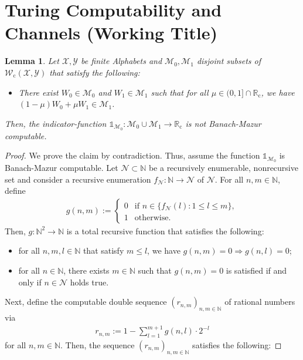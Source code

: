 \documentclass[conference]{IEEEtran}
\def\X{{\mathcal X}}
\def\Y{{\mathcal Y}}
\def\M{{\mathcal M}}
\def\N{{\mathcal N}}
\def\W{{\mathcal W}}
\def\NN{{\mathbb N}}
\def\RR{{\mathbb R}}
\newcommand{\RRc}{\RR_{\mathrm{c}}}
\newcommand{\Wc}{\W_{\mathrm{c}}}
\newtheorem{Lemma}[Theorem]{Lemma}
\begin{document}
\section{Turing Computability and Channels (Working Title)}
	\begin{Lemma}	Let \(\X,\Y\) be finite Alphabets and \(\M_0, \M_1\) disjoint subsets of \(\Wc(\X,\Y)\) that satisfy the following:
					\begin{itemize}	\item There exist \(W_0\in\M_0\) and \(W_1\in\M_1\) such that for all \(\mu \in (0,1]\cap \RRc\), 													
										we have \((1-\mu)W_0 + \mu W_1 \in \M_1\). 
					\end{itemize}
					Then, the indicator-function \(\mathds{1}_{\M_0} : \M_0\cup \M_1 \rightarrow \RRc\) is \emph{not} Banach-Mazur computable.
	\end{Lemma}\begin{proof}
					We prove the claim by contradiction. Thus, assume the function \(\mathds{1}_{\M_0}\) is Banach-Mazur computable. Let 
					\(\N\subset \NN\) be a recursively enumerable, nonrecursive set and consider a recursive enumeration \(f_\N : \NN \rightarrow \N\)
					of \(\N\). For all \(n,m\in\NN\), define
					\begin{align}	g(n,m) := 	\begin{cases}	0 &\text{if~} n \in \big\{f_\N(l) : 1 \leq l \leq m\big\}, \\ 	
																1 &\text{otherwise}.
												\end{cases}
					\end{align}
					Then, \(g: \NN^2 \rightarrow \NN\) is a total recursive function that satisfies the following:
					\begin{itemize}	\item 	for all \(n,m,l\in\NN\) that satisfy \(m\leq l\), we have \linebreak \(g(n,m) = 0 \Rightarrow g(n,l) = 0\);
									\item	for all \(n\in\NN\), there exists \(m\in\NN\) such that \(g(n,m) = 0\) is satisfied if and only if 
											\(n\in \N\) holds true.
					\end{itemize}
					Next, define the computable double sequence \((r_{n,m})_{n,m\in\NN}\) of rational numbers via
					\begin{align}	r_{n,m} := 1 - \sum_{l = 1}^{m+1} g(n,l)\cdot 2^{-l}
					\end{align}
					for all \(n,m\in\NN\). Then, the sequence \((r_{n,m})_{n,m\in\NN}\) satisfies the following:

\end{proof}
\end{document}
